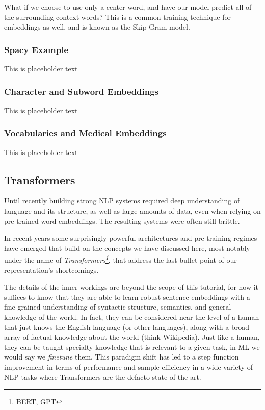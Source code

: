 What if we choose to use only a center word, and have our model predict all of the surrounding context words? This is a common training technique for embeddings as well, and is known as the Skip-Gram model.

\subsubsection{Spacy Example}
This is placeholder text

\subsubsection{Character and Subword Embeddings}
This is placeholder text

\subsubsection{Vocabularies and Medical Embeddings}
This is placeholder text

\subsection{Transformers}
Until recently building strong NLP systems required deep understanding of language and its structure, as well as large amounts of data, even when relying on pre-trained word embeddings.
The resulting systems were often still brittle.

In recent years some surprisingly powerful architectures and pre-training regimes have emerged that build on the concepts we have discussed here, most notably under the name of \textit{Transformers\footnote{BERT, GPT}}, that address the last bullet point of our representation's shortcomings.

The details of the inner workings are beyond the scope of this tutorial, for now it suffices to know that they are able to learn robust sentence embeddings with a fine grained understanding of syntactic structure, semantics, and general knowledge of the world.
In fact, they can be considered near the level of a human that just knows the English language (or other languages), along with a broad array of factual knowledge about the world (think Wikipedia).
Just like a human, they can be taught specialty knowledge that is relevant to a given task, in ML we would say we \textit{finetune} them.
This paradigm shift has led to a step function improvement in terms of performance and sample efficiency in a wide variety of NLP tasks where Transformers are the defacto state of the art.

